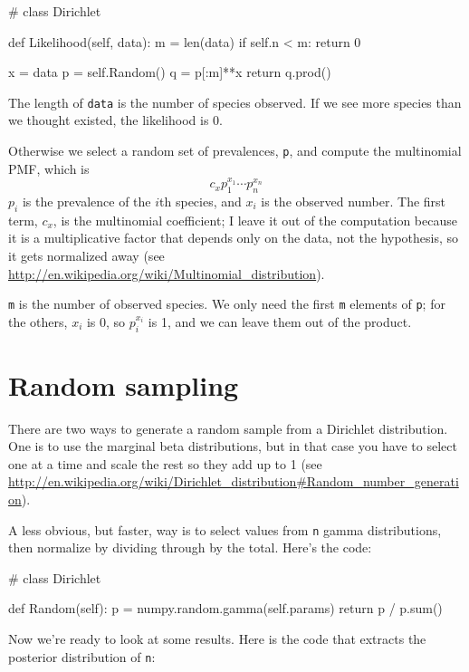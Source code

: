 \documentclass[12pt]{book}
\theoremstyle{exercise}
\begin{document}
\begin{code}
# class Dirichlet

    def Likelihood(self, data):
        m = len(data)
        if self.n < m:
            return 0

        x = data
        p = self.Random()
        q = p[:m]**x
        return q.prod()
\end{code}

The length of {\tt data} is the number of species observed.  If
we see more species than we thought existed, the likelihood is 0.

Otherwise we select a random set of prevalences, {\tt p}, and
compute the multinomial PMF, which is
%
\[ c_x  p_1^{x_1} \cdots p_n^{x_n} \]
%
$p_i$ is the prevalence of the $i$th species, and $x_i$ is the
observed number.  The first term, $c_x$, is the multinomial
coefficient; I leave it out of the computation because it is
a multiplicative factor that depends only
on the data, not the hypothesis, so it gets normalized away
(see \url{http://en.wikipedia.org/wiki/Multinomial_distribution}).

{\tt m} is the number of observed species.
We only need the first {\tt m} elements of {\tt p};
for the others, $x_i$ is 0, so
$p_i^{x_i}$ is 1, and we can leave them out of the product.


\section{Random sampling}
\label{randomdir}

There are two ways to generate a random sample from a Dirichlet
distribution.  One is to use the marginal beta distributions, but in
that case you have to select one at a time and scale the rest so they
add up to 1 (see
\url{http://en.wikipedia.org/wiki/Dirichlet_distribution#Random_number_generation}).

A less obvious, but faster, way is to select values from {\tt n} gamma
distributions, then normalize by dividing through by the total. 
Here's the code:

\begin{code}
# class Dirichlet

    def Random(self):
        p = numpy.random.gamma(self.params)
        return p / p.sum()
\end{code}

Now we're ready to look at some results.  Here is the code that extracts
the posterior distribution of {\tt n}:
\end{document}
